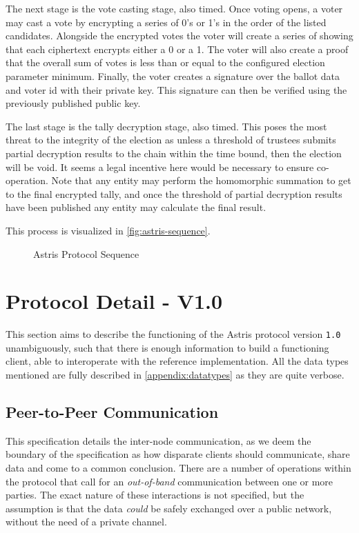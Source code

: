 The next stage is the vote casting stage, also timed. Once voting opens, a voter may cast a vote by encrypting a series of 0's or 1's in the order of the listed candidates. Alongside the encrypted votes the voter will create a series of  showing that each ciphertext encrypts either a 0 or a 1. The voter will also create a proof that the overall sum of votes is less than or equal to the configured election parameter minimum. Finally, the voter creates a signature over the ballot data and voter id with their private key. This signature can then be verified using the previously published public key.

The last stage is the tally decryption stage, also timed. This poses the most threat to the integrity of the election as unless a threshold of trustees submits partial decryption results to the chain within the time bound, then the election will be void. It seems a legal incentive here would be necessary to ensure co-operation. Note that any entity may perform the homomorphic summation to get to the final encrypted tally, and once the threshold of partial decryption results have been published any entity may calculate the final result.

This process is visualized in \autoref{fig:astris-sequence}.

\begin{figure}[H]
    \centering
    
    \caption{Astris Protocol Sequence}
    \label{fig:astris-sequence}
\end{figure}

\section{Protocol Detail - V1.0}
\label{ch:astris:detail}

This section aims to describe the functioning of the Astris protocol version \texttt{1.0} unambiguously, such that there is enough information to build a functioning client, able to interoperate with the reference implementation. All the data types mentioned are fully described in \autoref{appendix:datatypes} as they are quite verbose.

\subsection{Peer-to-Peer Communication}
\label{ch:astris:detail:p2p}

This specification details the inter-node communication, as we deem the boundary of the specification as how disparate clients should communicate, share data and come to a common conclusion. There are a number of operations within the protocol that call for an \emph{out-of-band} communication between one or more parties. The exact nature of these interactions is not specified, but the assumption is that the data \emph{could} be safely exchanged over a public network, without the need of a private channel.

